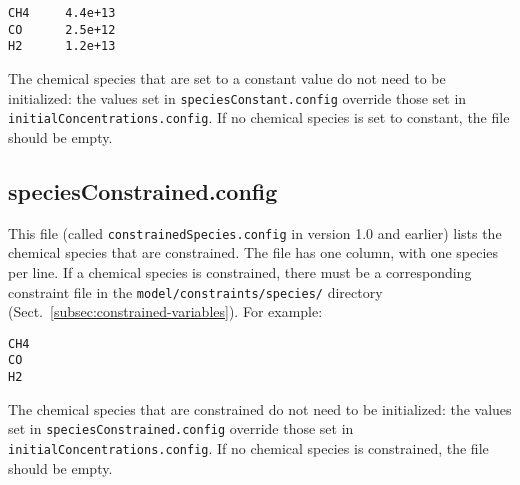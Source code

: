 \begin{verbatim}
CH4     4.4e+13
CO      2.5e+12
H2      1.2e+13
\end{verbatim}

The chemical species that are set to a constant value do not need to
be initialized: the values set in \texttt{speciesConstant.config}
override those set in \texttt{initialConcentrations.config}. If no
chemical species is set to constant, the file should be empty.

\subsection{speciesConstrained.config} \label{subsec:speciesconstrained}

This file (called \texttt{constrainedSpecies.config} in version 1.0
and earlier) lists the chemical species that are constrained. The file
has one column, with one species per line. If a chemical species is
constrained, there must be a corresponding constraint file in the
\texttt{model/constraints/species/} directory
(Sect.~\ref{subsec:constrained-variables}). For example:

\begin{verbatim}
CH4
CO
H2
\end{verbatim}

The chemical species that are constrained do not need to be
initialized: the values set in \texttt{speciesConstrained.config}
override those set in \texttt{initialConcentrations.config}. If no
chemical species is constrained, the file should be empty.
